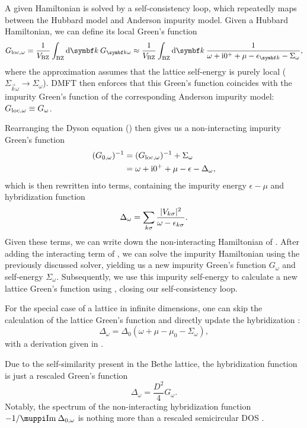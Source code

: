 A given Hamiltonian is solved by a self-consistency loop,
which repeatedly maps between the Hubbard model and Anderson impurity model.
Given a Hubbard Hamiltonian, we can define its local Green's function
\begin{equation}
    G_{\mloc,\omega}
    =
    \frac{1}{V_\mBZ} \int_\mBZ \md\vec{k}\> G_{\vec{k}\omega}
    \approx
    \frac{1}{V_\mBZ} \int_\mBZ \md\vec{k}\> \frac{1}{\omega + \mi0^+ + \mu - \epsilon_{\vec{k}} - \Sigma_\omega},
    \label{eq:greens-function-local}
\end{equation}
where the approximation assumes that the lattice self-energy is purely local
($\Sigma_{\vec{k}\omega} \to \Sigma_\omega$).
DMFT then enforces that this Green's function coincides with the impurity Green's function
of the corresponding Anderson impurity model: $G_{\mathrm{loc},\omega} \equiv G_\omega$.

Rearranging the Dyson equation () then gives us a non-interacting impurity
Green's function
\begin{align}
    (G_{0,\omega})^{-1}
     & =
    (G_{\mathrm{loc},\omega})^{-1} + \Sigma_\omega \\
     & =
    \omega + \mathrm{i}0^+ + \mu - \epsilon - \Delta_\omega,
\end{align}
which is then rewritten into terms,
containing the impurity energy $\epsilon - \mu$ and hybridization function
\begin{equation}
    \Delta_\omega = \sum_{k\sigma} \frac{\lvert V_{k\sigma}\rvert^2}{\omega - \epsilon_{k\sigma}}.
\end{equation}
Given these terms, we can write down the non-interacting Hamiltonian
of .
After adding the interacting term of , we can solve the impurity
Hamiltonian using the previously discussed solver,
yielding us a new impurity Green's function $G_\omega$
and self-energy $\Sigma_\omega$.
Subsequently, we use this impurity self-energy to
calculate a new lattice Green's function using ,
closing our self-consistency loop.

For the special case of a lattice in infinite dimensions,
one can skip the calculation of the lattice Green's function
and directly update the hybridization \cite{Lu2014}:
\begin{equation}
    \Delta_\omega = \Delta_{0}(\omega + \mu - \mu_0 - \Sigma_\omega),
\end{equation}
with a derivation given in .

Due to the self-similarity present in the Bethe lattice,
the hybridization function is just a rescaled Green's function
\begin{equation}
    \Delta_\omega = \frac{D^2}{4} G_\omega.
\end{equation}
Notably,
the spectrum of the non-interacting hybridization function $-1/\muppi \Im \Delta_{0,\omega}$
is nothing more than a rescaled semicircular DOS .
